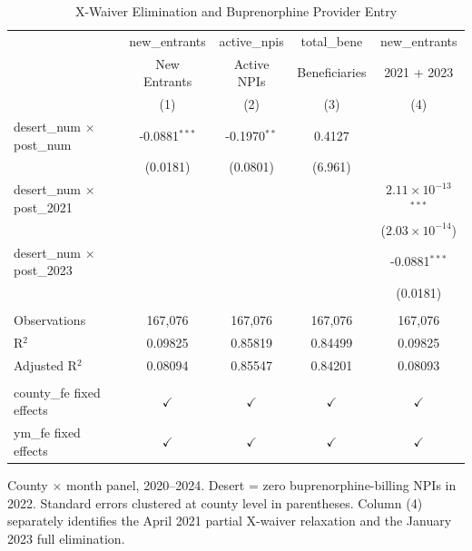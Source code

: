 
\begin{table}[htbp]
   \caption{\label{tab:did_main} X-Waiver Elimination and Buprenorphine Provider Entry}
   \bigskip
   \centering
   \begin{tabular}{lcccc}
      \toprule
                                         & new\_entrants   & active\_npis   & total\_bene   & new\_entrants\\   
                                         & New Entrants    & Active NPIs    & Beneficiaries & 2021 + 2023 \\   
                                         & (1)             & (2)            & (3)           & (4)\\  
      \midrule 
      desert\_num $\times$ post\_num     & -0.0881$^{***}$ & -0.1970$^{**}$ & 0.4127        &   \\   
                                         & (0.0181)        & (0.0801)       & (6.961)       &   \\   
      desert\_num $\times$ post\_2021    &                 &                &               & $2.11\times 10^{-13}$$^{***}$\\    
                                         &                 &                &               & ($2.03\times 10^{-14}$)\\    
      desert\_num $\times$ post\_2023    &                 &                &               & -0.0881$^{***}$\\   
                                         &                 &                &               & (0.0181)\\   
       \\
      Observations                       & 167,076         & 167,076        & 167,076       & 167,076\\  
      R$^2$                              & 0.09825         & 0.85819        & 0.84499       & 0.09825\\  
      Adjusted R$^2$                     & 0.08094         & 0.85547        & 0.84201       & 0.08093\\  
       \\
      county\_fe fixed effects           & $\checkmark$    & $\checkmark$   & $\checkmark$  & $\checkmark$\\   
      ym\_fe fixed effects               & $\checkmark$    & $\checkmark$   & $\checkmark$  & $\checkmark$\\   
      \bottomrule
   \end{tabular}
   
   \par \raggedright 
   County $\times$ month panel, 2020--2024. Desert = zero buprenorphine-billing NPIs in 2022. Standard errors clustered at county level in parentheses. Column (4) separately identifies the April 2021 partial X-waiver relaxation and the January 2023 full elimination.
\end{table}



